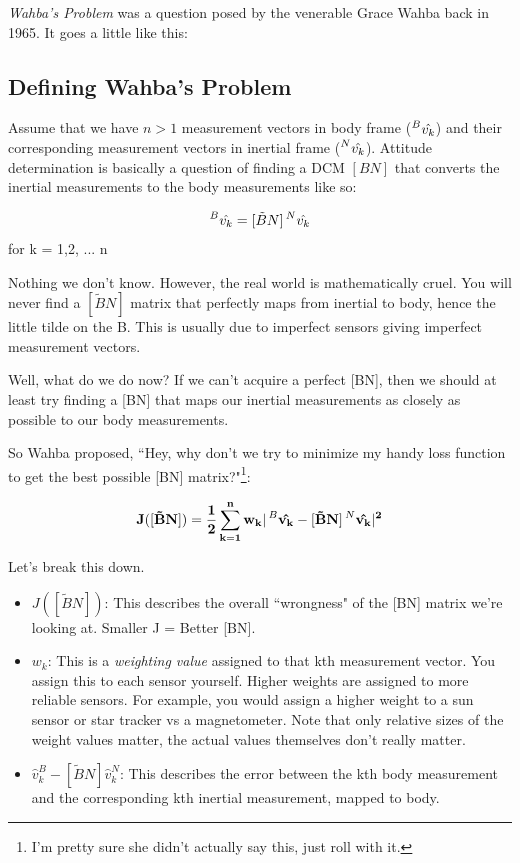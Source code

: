 \documentclass[a4paper,14pt]{extreport}
\newcommand{\vk}[1]{\prescript{#1}{}{\hat{v_k}}}
\begin{document}
\emph{Wahba's Problem} was a question posed by the venerable Grace Wahba back in 1965. It goes a little like this:
\subsection{Defining Wahba's Problem}
Assume that we have $n>1$ measurement vectors in body frame ($\vk{B}$) and their corresponding measurement vectors in inertial frame ($\vk{N}$). Attitude determination is basically a question of finding a DCM $[BN]$ that converts the inertial measurements to the body measurements like so:
\begin{center}
\[
\vk{B}= [\tilde{B}N]\vk{N}
\]
for k = 1,2, ... n
\end{center}
Nothing we don't know. However, the real world is mathematically cruel. You will never find a $[\tilde{B}N]$ matrix that perfectly maps from inertial to body, hence the little tilde on the B. This is usually due to imperfect sensors giving imperfect measurement vectors. 

Well, what do we do now? If we can't acquire a perfect [BN], then we should at least try finding a [BN] that maps our inertial measurements as closely as possible to our body measurements. 

So Wahba proposed, ``Hey, why don't we try to minimize my handy loss function to get the best possible [BN] matrix?"\footnote{I'm pretty sure she didn't actually say this, just roll with it.}:

\[
\mathbf{
J([\tilde{B}N]) = \dfrac{1}{2} \sum^n_{k=1} w_k |\vk{B} - [\tilde{B}N]\vk{N}|^2}
\]

Let's break this down.
\begin{itemize}
\item{$J([\tilde{B}N])$: This describes the overall ``wrongness" of the [BN] matrix we're looking at. Smaller J = Better [BN].
}
\item{$w_k$: This is a \emph{weighting value} assigned to that kth measurement vector. You assign this to each sensor yourself. Higher weights are assigned to more reliable sensors. For example, you would assign a higher weight to a sun sensor or star tracker vs a magnetometer. Note that only relative sizes of the weight values matter, the actual values themselves don't really matter.
}
\item{$\hat{v}_k^B - [\tilde{B}N]\hat{v}_k^N$: This describes the error between the kth body measurement and the corresponding kth inertial measurement, mapped to body.}
\end{itemize}
\end{document}

